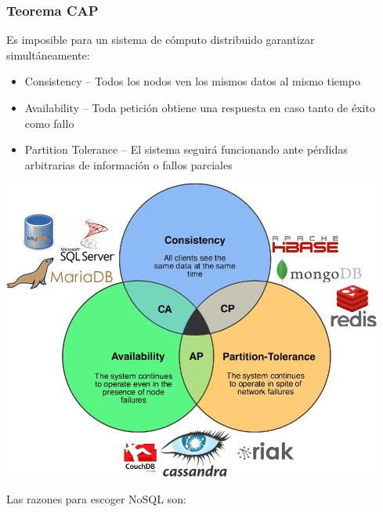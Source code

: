 \documentclass[
]{book}
\providecommand{\tightlist}{%
  \setlength{\itemsep}{0pt}\setlength{\parskip}{0pt}}
\begin{document}
\subsubsection{Teorema CAP}\label{teorema-cap}

Es imposible para un sistema de cómputo distribuido garantizar simultáneamente:

\begin{itemize}
\tightlist
\item
  Consistency -- Todos los nodos ven los mismos datos al mismo tiempo
\item
  Availability -- Toda petición obtiene una respuesta en caso tanto de éxito como fallo
\item
  Partition Tolerance -- El sistema seguirá funcionando ante pérdidas arbitrarias de información o fallos parciales
\end{itemize}

\includegraphics{images/TeoremaCAP.jpg}

Las razones para escoger NoSQL son:
\end{document}
